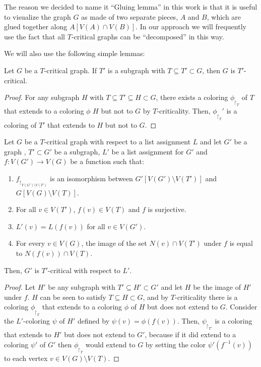 The reason we decided to name it ``Gluing lemma'' in this work is that it is useful to visualize the graph $G$ as made of two separate pieces, $A$ and $B$, which are glued together along $A[V(A) \cap V(B)]$. In our approach we will frequently use the fact that all $T$-critical graphs can be ``decomposed'' in this way. 

We will also use the following simple lemmas:

\begin{lemma}
\label{extensionlemma}
Let $G$ be a $T$-critical graph. If $T'$ is a subgraph with 
$T \subseteq T' \subset G$, then $G$ is $T'$-critical.
\end{lemma}
\begin{proof}
For any subgraph $H$ with $T \subseteq T' \subseteq H \subset G$, there exists a coloring
$\phi_{\restriction_T}$ of $T$ that extends to a coloring $\phi$ $H$ but not to $G$ by $T$-criticality. Then, $\phi_{\restriction_T}'$ is a coloring of $T'$ that extends to $H$ but not to $G$.
\end{proof}

\begin{lemma}
\label{duplicationlemma}
Let $G$ be a $T$-critical graph with respect to a list assignment $L$ and let $G'$ be a graph
, $T' \subset G'$ be a subgraph, $L'$ be a list assignment for $G'$ and $f : V(G') \rightarrow V(G)$ be a function such that:

\begin{enumerate}
	\item	$f_{\restriction_{V(G') \setminus V(T')}}$ is an isomorphism between 
	$G'[V(G') \setminus V(T')]$ and $G[V(G) \setminus V(T)]$.
	\item For all $v \in V(T')$, $f(v) \in V(T)$ and $f$ is surjective.  
	\item $L'(v) = L(f(v))$ for all $v \in V(G')$. 
	\item For every $v \in V(G)$, the image of the set $N(v) \cap V(T')$ under $f$
	is equal to $N(f(v)) \cap V(T)$.  
\end{enumerate}

Then, $G'$ is $T'$-critical with respect to $L'$.
 
\end{lemma}
\begin{proof}
Let $H'$ be any subgraph with $T' \subseteq H' \subset G'$ and let $H$ be the image of $H'$ under 
$f$. $H$ can be seen to satisfy $T \subseteq H \subset G$, and by $T$-criticality there is a 
coloring $\phi_{\restriction_T}$ that extends to a coloring $\phi$ of $H$ but does not extend to $G$.
Consider the $L'$-coloring $\psi$ of $H'$ defined by $\psi(v) = \phi(f(v))$. 
Then, $\psi_{\restriction_{T'}}$ is a coloring that extends to $H'$ but does not extend to $G'$,
because if it did extend to a coloring $\psi'$ of $G'$ 
then $\phi_{\restriction_T}$ would extend to $G$ by setting the
color $\psi'(f^{-1}(v))$ to each vertex $v \in V(G) \setminus V(T)$. 
\end{proof}

